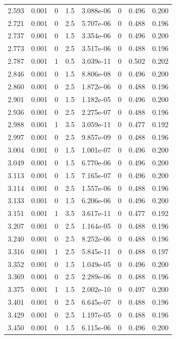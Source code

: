 \documentclass[preview]{standalone}
\begin{document}
{{{\begin{tabular}{L{1.2cm}C{1.2cm} C{0.3cm}C{0.5cm} C{1.4cm}C{1.4cm} C{1.4cm}C{1.4cm}}
  2.593  &  0.001  & 0     & 1.5 &  3.088e-06  & 0  & 0.496 &  0.200   \\ 
  2.721  &  0.001  & 0     & 2.5 &  5.707e-06  & 0  & 0.488 &  0.196   \\ 
  2.737  &  0.001  & 0     & 1.5 &  3.354e-06  & 0  & 0.496 &  0.200   \\ 
  2.773  &  0.001  & 0     & 2.5 &  3.517e-06  & 0  & 0.488 &  0.196   \\ 
  2.787  &  0.001  & 1     & 0.5 &  3.039e-11  & 0  & 0.502 &  0.202   \\ 
  2.846  &  0.001  & 0     & 1.5 &  8.806e-08  & 0  & 0.496 &  0.200   \\ 
  2.860  &  0.001  & 0     & 2.5 &  1.872e-06  & 0  & 0.488 &  0.196   \\ 
  2.901  &  0.001  & 0     & 1.5 &  1.182e-05  & 0  & 0.496 &  0.200   \\ 
  2.936  &  0.001  & 0     & 2.5 &  2.275e-07  & 0  & 0.488 &  0.196   \\ 
  2.988  &  0.001  & 1     & 3.5 &  3.059e-11  & 0  & 0.477 &  0.192   \\ 
  2.997  &  0.001  & 0     & 2.5 &  9.857e-09  & 0  & 0.488 &  0.196   \\ 
  3.004  &  0.001  & 0     & 1.5 &  1.001e-07  & 0  & 0.496 &  0.200   \\ 
  3.049  &  0.001  & 0     & 1.5 &  6.770e-06  & 0  & 0.496 &  0.200   \\ 
  3.113  &  0.001  & 0     & 1.5 &  7.165e-07  & 0  & 0.496 &  0.200   \\ 
  3.114  &  0.001  & 0     & 2.5 &  1.557e-06  & 0  & 0.488 &  0.196   \\ 
  3.133  &  0.001  & 0     & 1.5 &  6.206e-06  & 0  & 0.496 &  0.200   \\ 
  3.151  &  0.001  & 1     & 3.5 &  3.617e-11  & 0  & 0.477 &  0.192   \\ 
  3.207  &  0.001  & 0     & 2.5 &  1.164e-05  & 0  & 0.488 &  0.196   \\ 
  3.240  &  0.001  & 0     & 2.5 &  8.252e-06  & 0  & 0.488 &  0.196   \\ 
  3.316  &  0.001  & 1     & 2.5 &  5.845e-11  & 0  & 0.488 &  0.197   \\ 
  3.352  &  0.001  & 0     & 1.5 &  1.049e-05  & 0  & 0.496 &  0.200   \\ 
  3.369  &  0.001  & 0     & 2.5 &  2.289e-06  & 0  & 0.488 &  0.196   \\ 
  3.375  &  0.001  & 1     & 1.5 &  2.002e-10  & 0  & 0.497 &  0.200   \\ 
  3.401  &  0.001  & 0     & 2.5 &  6.645e-07  & 0  & 0.488 &  0.196   \\ 
  3.429  &  0.001  & 0     & 2.5 &  1.197e-05  & 0  & 0.488 &  0.196   \\ 
  3.450  &  0.001  & 0     & 1.5 &  6.115e-06  & 0  & 0.496 &  0.200   \\ 
\hline 
\end{tabular} 

}}}
\end{document}
